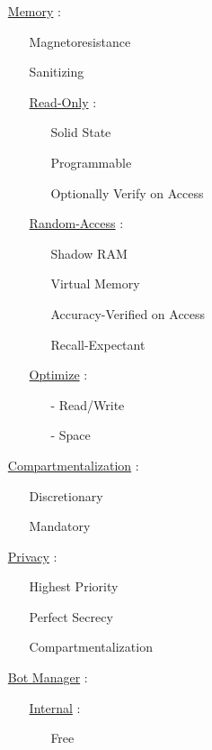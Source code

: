 \documentclass[11pt]{article}
\begin{document}
\begin{enumerate}
	\item[] \ul{Memory} :
	\begin{enumerate}
		\item[] Magnetoresistance
		\item[] Sanitizing
		
		\item[] \ul{Read-Only} :
		\begin{enumerate}
			\item[] Solid State
			\item[] Programmable
			\item[] Optionally Verify on Access
		\end{enumerate}
	
		\item[] \ul{Random-Access} :
		\begin{enumerate}
			\item[] Shadow RAM
			\item[] Virtual Memory
			\item[] Accuracy-Verified on Access
			\item[] Recall-Expectant
		\end{enumerate}
		
		\item[] \ul{Optimize}  :
		\begin{enumerate}
			\item[-] Read/Write
			\item[-] Space
		\end{enumerate}
	\end{enumerate}

	\item[] \ul{Compartmentalization} :
	\begin{enumerate}
		\item[] Discretionary
		\item[] Mandatory
	\end{enumerate}

	\item[] \ul{Privacy} :
	\begin{enumerate}
		\item[] Highest Priority
		\item[] Perfect Secrecy
		\item[] Compartmentalization
	\end{enumerate}
	
	\item[] \ul{Bot Manager} :
	\begin{enumerate}
		\item[] \ul{Internal}  :
		\begin{enumerate}
			\item[] Free
		\end{enumerate}
	

\end{enumerate}
\end{enumerate}
\end{document}

